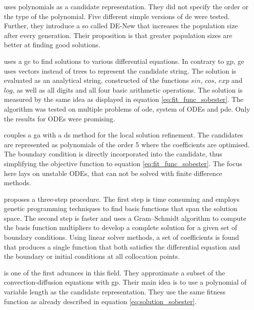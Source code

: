\documentclass[./\jobname.tex]{subfiles}
\begin{document}
\cite{panagant_solving_2014} uses polynomials as a candidate representation. They did not specify the order or the type of the polynomial. Five different simple versions of \gls{de} were tested. Further, they introduce a so called DE-New that increases the population size after every generation. Their proposition is that greater population sizes are better at finding good solutions. 

\cite{tsoulos_solving_2006} uses a \gls{ge} to find solutions to various differential equations. In contrary to \gls{gp}, \gls{ge} uses vectors instead of trees to represent the candidate string. The solution is evaluated as an analytical string, constructed of the functions $sin$, $cos$, $exp$ and $log$, as well as all digits and all four basic arithmetic operations. The solution is measured by the same idea as displayed in equation \ref{eq:fit_func_sobester}. The algorithm was tested on multiple problems of \gls{ode}, system of ODEs and \gls{pde}. Only the results for ODEs were promising. 

\cite{mastorakis_unstable_2006} couples a \gls{ga} with a \gls{ds} method for the local solution refinement. The candidates are represented as polynomials of the order 5 where the coefficients are optimised. The boundary condition is directly incorporated into the candidate, thus simplifying the objective function to equation \ref{eq:fit_func_sobester}. The focus here lays on unstable ODEs, that can not be solved with finite difference methods. 

\cite{kirstukas_hybrid_2005} proposes a three-step procedure. The first step is time consuming and employs genetic programming techniques to find basis functions that span the solution space. The second step is faster and uses a Gram–Schmidt algorithm to compute the basis function multipliers to develop a complete solution for a given set of boundary conditions. Using linear solver methods, a set of coefficients is found that produces a single function that both satisfies the differential equation and the boundary or initial conditions at all collocation points. 

\cite{howard_genetic_2001} is one of the first advances in this field. They approximate a subset of the convection-diffusion equations with \gls{gp}. Their main idea is to use a polynomial of variable length as the candidate representation. They use the same fitness function as already described in equation \ref{eq:solution_sobester}. 
\end{document}

